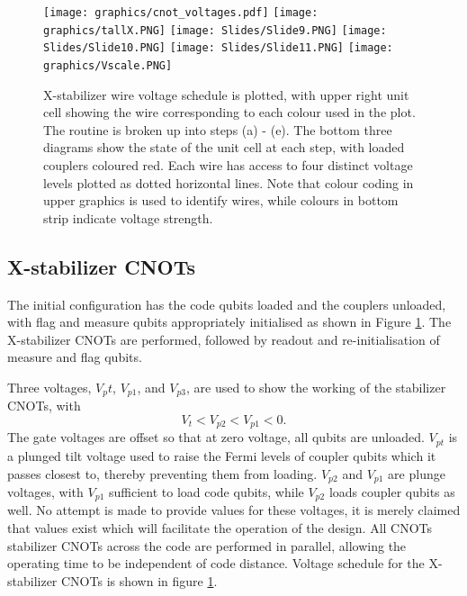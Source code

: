 \documentclass[../Thesis.tex]{subfiles}
\begin{document}
\begin{figure}[h]
    \centering
    \texttt{[image: graphics/cnot\_voltages.pdf]}
    \hspace{-15pt}\texttt{[image: graphics/tallX.PNG]} \vspace{2pt}\newline
    \texttt{[image: Slides/Slide9.PNG]}
    \texttt{[image: Slides/Slide10.PNG]}
    \texttt{[image: Slides/Slide11.PNG]}\hspace{10pt}
    \texttt{[image: graphics/Vscale.PNG]}
    \caption{X-stabilizer wire voltage schedule is plotted, with upper right unit cell showing the wire corresponding to each colour used in the plot. The routine is broken up into steps (a) - (e). The bottom three diagrams show the state of the unit cell at each step, with loaded couplers coloured red. Each wire has access to four distinct voltage levels plotted as dotted horizontal lines. Note that colour coding in upper graphics is used to identify wires, while colours in bottom strip indicate voltage strength.}
    \label{fig:X-CNOT}
\end{figure}


\subsection{X-stabilizer CNOTs}
The initial configuration has the code qubits loaded and the couplers unloaded, with flag and measure qubits appropriately initialised as shown in Figure \ref{fig:X-CNOT}. The X-stabilizer CNOTs are performed, followed by readout and re-initialisation of measure and flag qubits.

Three voltages, $V_pt$, $V_{p1}$, and $V_{p3}$, are used to show the working of the stabilizer CNOTs, with
\[V_t<V_{p2}<V_{p1}<0.\] 
The gate voltages are offset so that at zero voltage, all qubits are unloaded\cite{hill_surface_2015}. $V_{pt}$ is a plunged tilt voltage used to raise the Fermi levels of coupler qubits which it passes closest to, thereby preventing them from loading. $V_{p2}$ and $V_{p1}$ are plunge voltages, with $V_{p1}$ sufficient to load code qubits, while $V_{p2}$ loads coupler qubits as well. No attempt is made to provide values for these voltages, it is merely claimed that values exist which will facilitate the operation of the design. All CNOTs stabilizer CNOTs across the code are performed in parallel, allowing the operating time to be independent of code distance. Voltage schedule for the X-stabilizer CNOTs is shown in figure \ref{fig:X-CNOT}.
\end{document}
